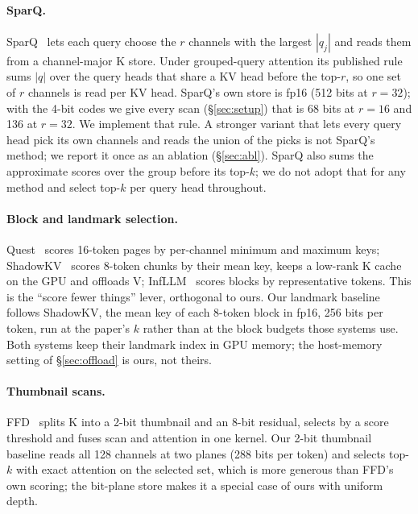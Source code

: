 \documentclass[10pt,twocolumn]{article}
\begin{document}
\paragraph{SparQ.} SparQ~\cite{sparq} lets each query choose the $r$ channels with the largest $|q_j|$ and reads them from a channel-major K store. Under grouped-query attention its published rule sums $|q|$ over the query heads that share a KV head before the top-$r$, so one set of $r$ channels is read per KV head. SparQ's own store is fp16 (512 bits at $r=32$); with the 4-bit codes we give every scan (\S\ref{sec:setup}) that is 68 bits at $r=16$ and 136 at $r=32$. We implement that rule. A stronger variant that lets every query head pick its own channels and reads the union of the picks is not SparQ's method; we report it once as an ablation (\S\ref{sec:abl}). SparQ also sums the approximate scores over the group before its top-$k$; we do not adopt that for any method and select top-$k$ per query head throughout.

\paragraph{Block and landmark selection.} Quest~\cite{quest} scores 16-token pages by per-channel minimum and maximum keys; ShadowKV~\cite{shadowkv} scores 8-token chunks by their mean key, keeps a low-rank K cache on the GPU and offloads V; InfLLM~\cite{infllm} scores blocks by representative tokens. This is the ``score fewer things'' lever, orthogonal to ours. Our landmark baseline follows ShadowKV, the mean key of each 8-token block in fp16, 256 bits per token, run at the paper's $k$ rather than at the block budgets those systems use. Both systems keep their landmark index in GPU memory; the host-memory setting of \S\ref{sec:offload} is ours, not theirs.

\paragraph{Thumbnail scans.} FFD~\cite{ffd} splits K into a 2-bit thumbnail and an 8-bit residual, selects by a score threshold and fuses scan and attention in one kernel. Our 2-bit thumbnail baseline reads all 128 channels at two planes (288 bits per token) and selects top-$k$ with exact attention on the selected set, which is more generous than FFD's own scoring; the bit-plane store makes it a special case of ours with uniform depth.
\end{document}
